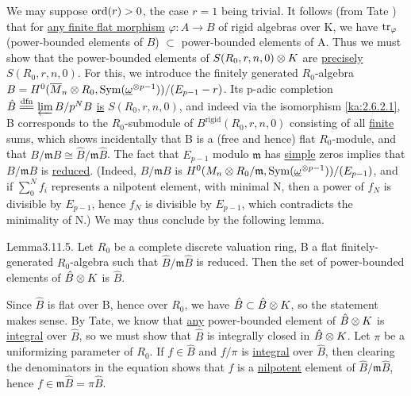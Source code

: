 \begin{kaproof}
We may suppose $\operatorname{ord}(r)>0$, the case $r=1$ being trivial. It follows (from Tate
\cite{tate71}) that for \uline{any finite flat morphism} $\varphi\colon A\to B$ of rigid
algebras over K, we have $\operatorname{tr}_\varphi$ (power-bounded elements of $B$)
$\subset$ power-bounded elements of A. Thus we must show that the power-bounded
elements of $S(R_0,r,n,0)\otimes K$ are \uline{precisely} $S(R_0,r,n,0)$. For
this, we introduce the finitely generated $R_0$-algebra $B =
H^0(\overline{M}_n\otimes R_0, \operatorname{Sym}(\underline{\omega}^{\otimes p-1}))/(E_{p-1}-r)$. Its p-adic
completion $\hat{B} \xlongequal{\mathrm{dfn}} \limleft B/p^N B$ \uline{is}
$S(R_0,r,n,0)$, and indeed via the isomorphism \eqref{ka:2.6.2.1}, B corresponds to the
$R_0$-submodule of $B^{\mathrm{rigid}}(R_0,r,n,0)$ consisting of all
\uline{finite} sums, which shows incidentally that B is a (free and hence) flat
$R_0$-module, and that $B/\mathfrak{m}B\cong \hat{B}/\mathfrak{m}\hat{B}$. The
fact that $E_{p-1}$ modulo $\mathfrak{m}$ has \uline{simple} zeros implies that
$B/\mathfrak{m}B$ is \uline{reduced}. (Indeed, $B/\mathfrak{m}B$ is
$H^0(M_n\otimes R_0/\mathfrak{m}, \operatorname{Sym}(\underline{\omega}^{\otimes p-1}))/(E_{p-1})$, and if
$\sum_0^N f_i$ represents a nilpotent element, with minimal N, then a power of
$f_N$ is divisible by $E_{p-1}$, hence $f_N$ is divisible by $E_{p-1}$, which
contradicts the minimality of N.) We may thus conclude by the following lemma.
\end{kaproof}

\begin{kathm}{Lemma}{3.11.5.}
Let $R_0$ be a complete discrete valuation ring, B a flat finitely-generated
$R_0$-algebra such that $\hat{B}/\mathfrak{m}\hat{B}$ is reduced. Then the set
of power-bounded elements of $\hat{B}\otimes K$ is $\hat{B}$.
\end{kathm}

\begin{kaproof}
Since $\hat{B}$ is flat over B, hence over $R_0$, we have
$\hat{B}\subset\hat{B}\otimes K$, so the statement makes sense. By Tate, we know
that \uline{any} power-bounded element of $\hat{B}\otimes K$ is \uline{integral}
over $\hat{B}$, so we must show that $\hat{B}$ is integrally closed in
$\hat{B}\otimes K$. Let $\pi$ be a uniformizing parameter of $R_0$. If
$f\in\hat{B}$ and $f/\pi$ is \uline{integral} over $\hat{B}$, then clearing the
denominators in the equation shows that $f$ is a \uline{nilpotent} element of
$\hat{B}/\mathfrak{m}\hat{B}$, hence $f\in\mathfrak{m}\hat{B} = \pi\hat{B}$.
\end{kaproof}

